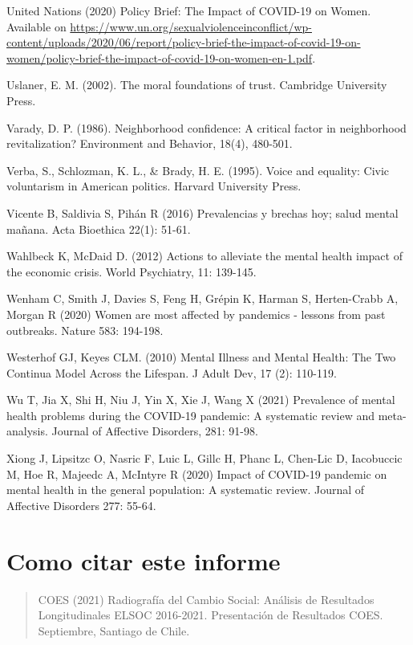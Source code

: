 \documentclass[
  12pt,
]{book}
\begin{document}
United Nations (2020) Policy Brief: The Impact of COVID-19 on Women. Available on \url{https://www.un.org/sexualviolenceinconflict/wp-content/uploads/2020/06/report/policy-brief-the-impact-of-covid-19-on-women/policy-brief-the-impact-of-covid-19-on-women-en-1.pdf}.

Uslaner, E. M. (2002). The moral foundations of trust. Cambridge University Press.

Varady, D. P. (1986). Neighborhood confidence: A critical factor in neighborhood revitalization? Environment and Behavior, 18(4), 480-501.

Verba, S., Schlozman, K. L., \& Brady, H. E. (1995). Voice and equality: Civic voluntarism in American politics. Harvard University Press.

Vicente B, Saldivia S, Pihán R (2016) Prevalencias y brechas hoy; salud mental mañana. Acta Bioethica 22(1): 51-61.

Wahlbeck K, McDaid D. (2012) Actions to alleviate the mental health impact of the economic crisis. World Psychiatry, 11: 139-145.

Wenham C, Smith J, Davies S, Feng H, Grépin K, Harman S, Herten-Crabb A, Morgan R (2020) Women are most affected by pandemics - lessons from past outbreaks. Nature 583: 194-198.

Westerhof GJ, Keyes CLM. (2010) Mental Illness and Mental Health: The Two Continua Model Across the Lifespan. J Adult Dev, 17 (2): 110-119.

Wu T, Jia X, Shi H, Niu J, Yin X, Xie J, Wang X (2021) Prevalence of mental health problems during the COVID-19 pandemic: A systematic review and meta-analysis. Journal of Affective Disorders, 281: 91-98.

Xiong J, Lipsitzc O, Nasric F, Luic L, Gillc H, Phanc L, Chen-Lic D, Iacobuccic M, Hoe R, Majeedc A, McIntyre R (2020) Impact of COVID-19 pandemic on mental health in the general population: A systematic review. Journal of Affective Disorders 277: 55-64.

\hypertarget{como-citar-este-informe}{%
\chapter*{Como citar este informe}\label{como-citar-este-informe}}

\begin{quote}
COES (2021) Radiografía del Cambio Social: Análisis de Resultados Longitudinales ELSOC 2016-2021. Presentación de Resultados COES. Septiembre, Santiago de Chile.
\end{quote}
\end{document}
